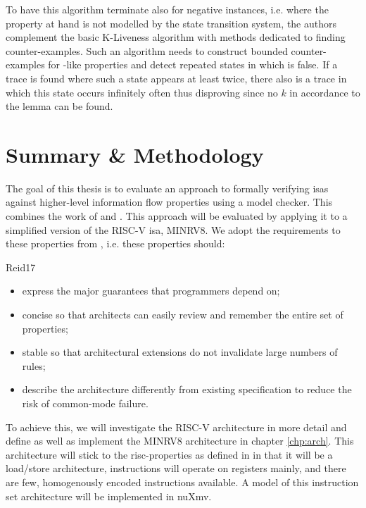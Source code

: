To have this algorithm terminate also for negative instances, i.e. where the property at hand is not modelled by the state transition system, the authors complement the basic K-Liveness algorithm with methods dedicated to finding counter-examples.
Such an algorithm needs to construct bounded counter-examples for -like properties and detect repeated states in which  is false.
If a trace is found where such a state appears at least twice, there also is a trace in which this state occurs infinitely often thus disproving  since no $ k $ in accordance to the lemma can be found.

\section{Summary \& Methodology}
\label{sec:sum-background}

The goal of this thesis is to evaluate an approach to formally verifying \glspl{isa} against higher-level information flow properties using a model checker.
This combines the work of \citeauthor{Reid17} \cite{Reid17} and \citeauthor{Ferraiuolo17} \cite{Ferraiuolo17}.
This approach will be evaluated by applying it to a simplified version of the RISC-V \gls{isa}, MINRV8.
We adopt the requirements to these properties from \cite{Reid17}, i.e. these properties should:
\begin{displaycquote}[pp.88:2-3]{Reid17}
    \begin{itemize}
        \item express the major guarantees that programmers depend on;
        \item {} concise so that architects can easily review and remember the entire set of properties;
        \item {} stable so that architectural extensions do not invalidate large numbers of rules;
        \item \textelp{} describe the architecture differently from existing specification to reduce the risk of common-mode failure.
    \end{itemize}
\end{displaycquote}

To achieve this, we will investigate the RISC-V architecture in more detail and define as well as implement the MINRV8 architecture in chapter \ref{chp:arch}.
This architecture will stick to the \gls{risc}-properties as defined in \cite{Hennessy12} in that it will be a load/store architecture, instructions will operate on registers mainly, and there are few, homogenously encoded instructions available.
A model of this instruction set architecture will be implemented in nuXmv.

